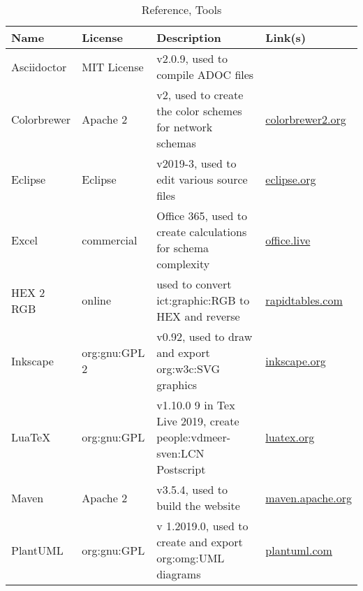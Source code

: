 \begin{table}[H]
    \caption{Reference, Tools}
    \label{tab:ref:ext:tools}
    \centering
    \begin{tabular}{p{} p{} p{} p{}}
        \toprule
        \textbf{Name} & \textbf{License} & \textbf{Description} & \textbf{Link(s)}\\
        \toprule

        Asciidoctor & MIT License &
        v2.0.9, used to compile ADOC files &
        \href{https://asciidoctor.org/}{}
        \\

        Colorbrewer & Apache 2 &
        v2, used to create the color schemes for network schemas &
        \href{http://colorbrewer2.org/#type=sequential&scheme=BuGn&n=9}{colorbrewer2.org}
        \\

        Eclipse & Eclipse &
        v2019-3, used to edit various source files &
        \href{https://www.eclipse.org/}{eclipse.org}
        \\

        Excel & commercial &
        Office 365, used to create calculations for schema complexity &
        \href{https://office.live.com/start/Excel.aspx}{office.live}
        \\

        HEX 2 RGB & online &
        used to convert \acs{ict:graphic:RGB} to HEX and reverse &
        \href{https://www.rapidtables.com/convert/color/hex-to-rgb.html}{rapidtables.com}
        \\

        Inkscape & \acs{org:gnu:GPL} 2 &
        v0.92, used to draw and export \ac{org:w3c:SVG} graphics &
        \href{https://inkscape.org/}{inkscape.org}
        \\

        LuaTeX & \acs{org:gnu:GPL} &
        v1.10.0 9 in Tex Live 2019, create \acs{people:vdmeer-sven:LCN} Postscript &
        \href{http://www.luatex.org/}{luatex.org}
        \\

        Maven & Apache 2 &
        v3.5.4, used to build the website &
        \href{https://maven.apache.org/}{maven.apache.org}
        \\

        PlantUML & \acs{org:gnu:GPL} &
        v 1.2019.0, used to create and export \ac{org:omg:UML} diagrams &
        \href{http://plantuml.com/}{plantuml.com}
        \\


\end{tabular}
\end{table}
